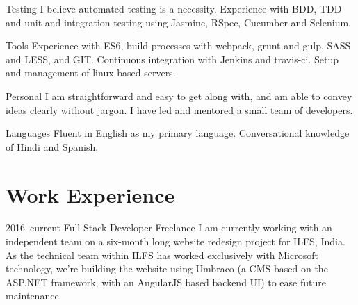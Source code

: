\documentclass[10pt,a4paper,sans]{moderncv}        %
\begin{document}
\vspace{6pt}

\cvline
{\textcolor{light}{Testing}}
{I believe automated testing is a necessity. Experience with BDD, TDD and unit and integration testing using Jasmine, RSpec, Cucumber and Selenium. }

\vspace{6pt}

\cvline
{\textcolor{light}{Tools}}
{Experience with ES6, build processes with webpack, grunt and gulp, SASS and LESS, and GIT. Continuous integration with Jenkins and travis-ci. Setup and management of linux based servers.}

\vspace{6pt}

\cvline
{\textcolor{light}{Personal}}
{I am straightforward and easy to get along with, and am able to convey ideas clearly without jargon. I have led and mentored a small team of developers.}

\vspace{6pt}

\cvline
{\textcolor{light}{Languages}}
{Fluent in English as my primary language. Conversational knowledge of Hindi and Spanish.}

\vspace{10pt}

\section{Work Experience}

\vspace{6pt}

\cventry
{\textcolor{light}{2016--current}}
{Full Stack Developer}
{}
{Freelance}{}
{I am currently working with an independent team on a six-month long website redesign project for ILFS, India. As the technical team within ILFS has worked exclusively with Microsoft technology, we're building the website using Umbraco (a CMS based on the ASP.NET framework, with an AngularJS based backend UI) to ease future maintenance.}

\vspace{8pt}
\end{document}
